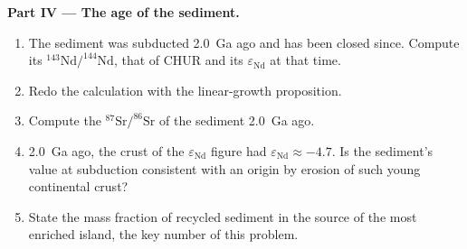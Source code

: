 \begin{problem}
\noindent\textbf{Part IV --- The age of the sediment.}
\begin{enumerate}[resume]
\item The sediment was subducted \qty{2.0}{Ga} ago and has been closed since.
Compute its $^{143}\mathrm{Nd}/^{144}\mathrm{Nd}$, that of CHUR and its
$\varepsilon_{\mathrm{Nd}}$ at that time.
\item Redo the calculation with the linear-growth proposition.
\item Compute the $^{87}\mathrm{Sr}/^{86}\mathrm{Sr}$ of the sediment \qty{2.0}{Ga} ago.
\item \qty{2.0}{Ga} ago, the crust of the $\varepsilon_{\mathrm{Nd}}$ figure had
$\varepsilon_{\mathrm{Nd}} \approx -4.7$. Is the sediment's value at subduction consistent
with an origin by erosion of such young continental crust?
\item State the mass fraction of recycled sediment in the source of the most
enriched island, the key number of this problem.
\end{enumerate}
\end{problem}
